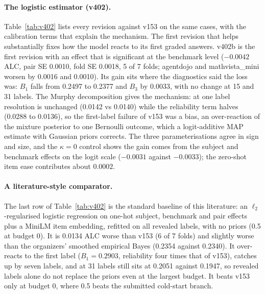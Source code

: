 \documentclass{article}
\begin{document}
\paragraph{The logistic estimator (v402).} Table~\ref{tab:v402} lists every revision against v153 on the same cases, with the calibration terms that explain the mechanism. The first revision that helps substantially fixes how the model reacts to its first graded answers. v402b is the first revision with an effect that is significant at the benchmark level ($-0.0042$ ALC, pair SE 0.0010, fold SE 0.0018, 5 of 7 folds; agentdojo and mathvista\_mini worsen by 0.0016 and 0.0010). Its gain sits where the diagnostics said the loss was: $B_1$ falls from 0.2497 to 0.2377 and $B_3$ by 0.0033, with no change at 15 and 31 labels. The Murphy decomposition gives the mechanism: at one label resolution is unchanged (0.0142 vs 0.0140) while the reliability term halves (0.0288 to 0.0136), so the first-label failure of v153 was a bias, an over-reaction of the mixture posterior to one Bernoulli outcome, which a logit-additive MAP estimate with Gaussian priors corrects. The three parameterisations agree in sign and size, and the $\kappa{=}0$ control shows the gain comes from the subject and benchmark effects on the logit scale ($-0.0031$ against $-0.0033$); the zero-shot item ease contributes about $0.0002$.

\paragraph{A literature-style comparator.} The last row of Table~\ref{tab:v402} is the standard baseline of this literature: an $\ell_2$-regularised logistic regression on one-hot subject, benchmark and pair effects plus a MiniLM item embedding, refitted on all revealed labels, with no priors (0.5 at budget 0). It is 0.0134 ALC worse than v153 (6 of 7 folds) and slightly worse than the organizers' smoothed empirical Bayes (0.2354 against 0.2340). It over-reacts to the first label ($B_1=0.2903$, reliability four times that of v153), catches up by seven labels, and at 31 labels still sits at 0.2051 against 0.1947, so revealed labels alone do not replace the priors even at the largest budget. It beats v153 only at budget 0, where 0.5 beats the submitted cold-start branch.
\end{document}
